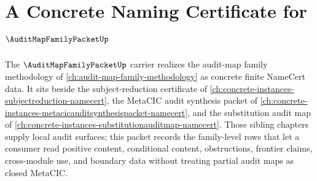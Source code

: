 \chapter{A Concrete Naming Certificate for $\AuditMapFamilyPacketUp$}
\label{ch:concrete-instances-auditmapfamilypacket-namecert}

The $\AuditMapFamilyPacketUp$ carrier realizes the audit-map family methodology of \autoref{ch:audit-map-family-methodology} as concrete finite NameCert data. It sits beside the subject-reduction certificate of \autoref{ch:concrete-instances-subjectreduction-namecert}, the MetaCIC audit synthesis packet of \autoref{ch:concrete-instances-metacicauditsynthesispacket-namecert}, and the substitution audit map of \autoref{ch:concrete-instances-substitutionauditmap-namecert}. Those sibling chapters supply local audit surfaces; this packet records the family-level rows that let a consumer read positive content, conditional content, obstructions, frontier claims, cross-module use, and boundary data without treating partial audit maps as closed MetaCIC.

